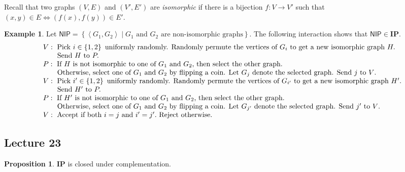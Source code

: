 \documentclass[10pt,letterpaper,cm]{nupset}
\theoremstyle{definition}
\newtheorem{exmp}[definition]{Example}
\theoremstyle{theorem}
\newtheorem{prop}[definition]{Proposition}
\theoremstyle{remark}
\newcommand{\1}{\mathbf{1}}
\newcommand{\0}{\vec 0}
\begin{document}
\smallskip

Recall that two graphs $\left(V, E\right)$ and $\left(V', E'\right)$ are \textit{isomorphic} if there is a bijection $f: V \to V'$ such that $\left(x,y\right) \in E \iff \left(f(x), f(y)\right)\in E'$.

\begin{exmp}
Let $\mathsf{NIP}=  \left\{ \left\langle G_1, G_2 \right\rangle \mid G_1 \text{ and }G_2 \text{ are non-isomorphic graphs}\right\}$. The following interaction shows that $\mathsf{NIP} \in \mathbf{IP}$.
\[
\begin{array}{l}{V : \text { Pick } i \in \left\{1,2\right\} \text { uniformly randomly. Randomly permute the vertices of } G_{i} \text { to get a  new isomorphic graph } H .} \\ {\text {\quad \quad Send } H \text { to } P .} \\ {P : \text { If } H \text { is not isomorphic to one of } G_1 \text{ and } G_2 \text {, then select the other graph. }} \\ {
\text {\quad \quad Otherwise, select one of } G_1 \text{ and } G_2 \text { by flipping a coin. Let } G_j \text{ denote the selected graph. Send } j \text { to } V \text {. }} \\
{V : \text { Pick } i' \in \left\{1,2\right\} \text { uniformly randomly. Randomly permute the vertices of } G_{i'} \text { to get a new isomorphic graph } H' .} \\ { \text {\quad \quad Send } H' \text { to } P .} \\ {P : \text { If } H' \text { is not isomorphic to one of } G_1 \text{ and } G_2 \text {, then select the other graph. }} \\ {
\text {\quad \quad Otherwise, select one of } G_1 \text{ and } G_2 \text { by flipping a coin. Let } G_{j'} \text{ denote the selected graph. Send } j' \text { to } V \text {. }}
\\ {V : \text { Accept if both } i=j \text{ and } i' =j'. \text { Reject otherwise. }}\end{array}
\] 
\end{exmp}

\subsection{Lecture 23}

\begin{prop}
$\mathbf{IP}$ is closed under complementation. 
\end{prop}
\end{document}
